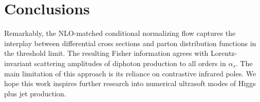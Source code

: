 \section{Conclusions}\label{sec:conclusions}

Remarkably, the NLO-matched conditional normalizing flow captures the
interplay between differential cross sections and parton distribution
functions in the threshold limit. The resulting Fisher information
agrees with Lorentz-invariant scattering amplitudes of diphoton
production to all orders in $\alpha_s$. The main limitation of this
approach is its reliance on contrastive infrared poles. We hope this
work inspires further research into numerical ultrasoft modes of Higgs
plus jet production.

